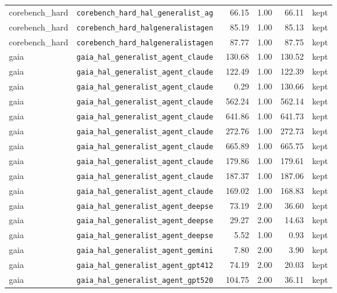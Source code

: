 {\begin{longtable}{llrrrl}
corebench\_hard & \texttt{\scriptsize corebench\_hard\_hal\_generalist\_ag~} & 66.15 & 1.00 & 66.11 & kept \\
corebench\_hard & \texttt{\scriptsize corebench\_hard\_halgeneralistagen~} & 85.19 & 1.00 & 85.13 & kept \\
corebench\_hard & \texttt{\scriptsize corebench\_hard\_halgeneralistagen~} & 87.77 & 1.00 & 87.75 & kept \\
gaia & \texttt{\scriptsize gaia\_hal\_generalist\_agent\_claude~} & 130.68 & 1.00 & 130.52 & kept \\
gaia & \texttt{\scriptsize gaia\_hal\_generalist\_agent\_claude~} & 122.49 & 1.00 & 122.39 & kept \\
gaia & \texttt{\scriptsize gaia\_hal\_generalist\_agent\_claude~} & 0.29 & 1.00 & 130.66 & kept \\
gaia & \texttt{\scriptsize gaia\_hal\_generalist\_agent\_claude~} & 562.24 & 1.00 & 562.14 & kept \\
gaia & \texttt{\scriptsize gaia\_hal\_generalist\_agent\_claude~} & 641.86 & 1.00 & 641.73 & kept \\
gaia & \texttt{\scriptsize gaia\_hal\_generalist\_agent\_claude~} & 272.76 & 1.00 & 272.73 & kept \\
gaia & \texttt{\scriptsize gaia\_hal\_generalist\_agent\_claude~} & 665.89 & 1.00 & 665.75 & kept \\
gaia & \texttt{\scriptsize gaia\_hal\_generalist\_agent\_claude~} & 179.86 & 1.00 & 179.61 & kept \\
gaia & \texttt{\scriptsize gaia\_hal\_generalist\_agent\_claude~} & 187.37 & 1.00 & 187.06 & kept \\
gaia & \texttt{\scriptsize gaia\_hal\_generalist\_agent\_claude~} & 169.02 & 1.00 & 168.83 & kept \\
gaia & \texttt{\scriptsize gaia\_hal\_generalist\_agent\_deepse~} & 73.19 & 2.00 & 36.60 & kept \\
gaia & \texttt{\scriptsize gaia\_hal\_generalist\_agent\_deepse~} & 29.27 & 2.00 & 14.63 & kept \\
gaia & \texttt{\scriptsize gaia\_hal\_generalist\_agent\_deepse~} & 5.52 & 1.00 & 0.93 & kept \\
gaia & \texttt{\scriptsize gaia\_hal\_generalist\_agent\_gemini~} & 7.80 & 2.00 & 3.90 & kept \\
gaia & \texttt{\scriptsize gaia\_hal\_generalist\_agent\_gpt412~} & 74.19 & 2.00 & 20.03 & kept \\
gaia & \texttt{\scriptsize gaia\_hal\_generalist\_agent\_gpt520~} & 104.75 & 2.00 & 36.11 & kept \\

\end{longtable}}
